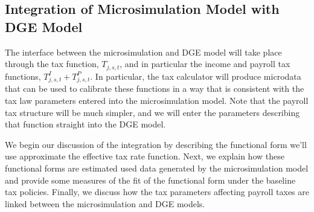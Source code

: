 \documentclass[letterpaper,12pt]{article}
\theoremstyle{definition}
\begin{document}
\begin{spacing}{1.5}
%
%

    \FloatBarrier


\section{Integration of Microsimulation Model with DGE Model}\label{SecIntegr}

 The interface between the microsimulation and DGE model will take place through the tax function, $T_{j,s,t}$, and in particular the income and payroll tax functions, $T^I_{j,s,t} + T^P_{j,s,t}$.  In particular, the tax calculator will produce microdata that can be used to calibrate these functions in a way that is consistent with the tax law parameters entered into the microsimulation model.  Note that the payroll tax structure will be much simpler, and we will enter the parameters describing that function straight into the DGE model.

 We begin our discussion of the integration by describing the functional form we'll use approximate the effective tax rate function.  Next, we explain how these functional forms are estimated used data generated by the microsimulation model and provide some measures of the fit of the functional form under the baseline tax policies.  Finally, we discuss how the tax parameters affecting payroll taxes are linked between the microsimulation and DGE models.



\end{spacing}
\end{document}
